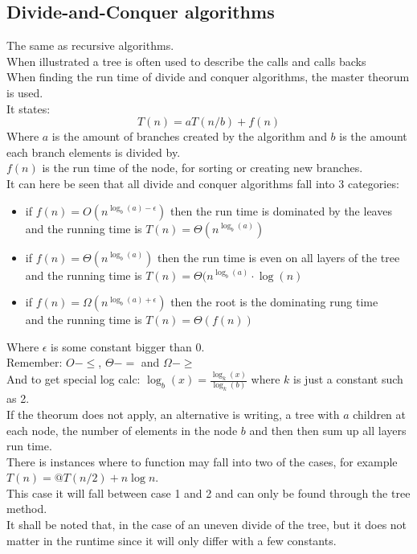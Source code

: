 \documentclass[12pt, a4paper]{article}
\begin{document}
			\subsection{Divide-and-Conquer algorithms}
				The same as recursive algorithms.\\
				When illustrated a tree is often used to describe the calls and calls backs\\
				When finding the run time of divide and conquer algorithms, the master theorum is used.\\
				It states:
				$$T(n)=aT(n/b)+f(n)$$
				Where $a$ is the amount of branches created by the algorithm and $b$ is the amount each branch elements is divided by.\\
				$f(n)$ is the run time of the node, for sorting or creating new branches.\\
				It can here be seen that all divide and conquer algorithms fall into 3 categories:
				\begin{itemize}
					\item if $f(n)=O(n^{\log_b(a)-\epsilon})$ then the run time is dominated by the leaves\\
							  and the running time is $T(n)=\Theta(n^{\log_b(a)})$
					\item if $f(n)=\Theta(n^{\log_b(a)})$ then the run time is even on all layers of the tree\\
						and the running time is $T(n)=\Theta(n^{\log_b(a)}\cdot \log(n)$
			 		\item if $f(n)=\Omega(n^{\log_b(a)+\epsilon})$ then the root is the dominating rung time\\
							  and the running time is $T(n)=\Theta(f(n))$
				\end{itemize}
				Where $\epsilon$ is some constant bigger than 0.\\
				Remember: $O - \leq$, $\Theta - =$ and $\Omega - \geq$\\
				And to get special log calc: $\log_b(x)=\frac{\log_k(x)}{\log_k(b)}$ where $k$ is just a constant such as 2.\\
				If the theorum does not apply, an alternative is writing, a tree with $a$ children at each node, the number of elements in the node $b$ and then then sum up all layers run time.\\[4mm]
				There is instances where to function may fall into two of the cases, for example $T(n)=@T(n/2)+n\log n$.\\
				This case it will fall between case 1 and 2 and can only be found through the tree method.\\
				It shall be noted that, in the case of an uneven divide of the tree, but it does not matter in the runtime since it will only differ with a few constants.
\end{document}
